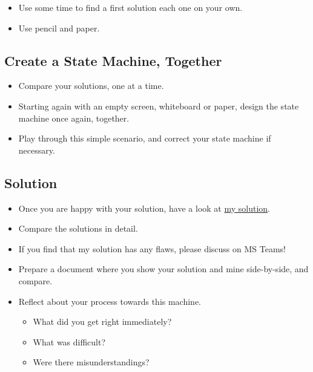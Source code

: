 \documentclass[10pt, twoside, twocolumn]{book}
\providecommand{\tightlist}{%
  \setlength{\itemsep}{0pt}\setlength{\parskip}{0pt}}
\begin{document}
\begin{itemize}
\tightlist
\item
  Use some time to find a first solution each one on your own.
\item
  Use pencil and paper.
\end{itemize}

\hypertarget{create-a-state-machine-together}{%
\subsection{Create a State Machine,
Together}\label{create-a-state-machine-together}}

\begin{itemize}
\tightlist
\item
  Compare your solutions, one at a time.
\item
  Starting again with an empty screen, whiteboard or paper, design the
  state machine once again, together.
\item
  Play through this simple scenario, and correct your state machine if
  necessary.
\end{itemize}

\hypertarget{solution}{%
\subsection{Solution}\label{solution}}

\begin{itemize}
\tightlist
\item
  Once you are happy with your solution, have a look at
  \href{files/kitchen-timer.pdf}{my solution}.
\item
  Compare the solutions in detail.
\item
  If you find that my solution has any flaws, please discuss on MS
  Teams!
\item
  Prepare a document where you show your solution and mine side-by-side,
  and compare.
\item
  Reflect about your process towards this machine.

  \begin{itemize}
  \tightlist
  \item
    What did you get right immediately?
  \item
    What was difficult?
  \item
    Were there misunderstandings?
  \end{itemize}
\end{itemize}
\end{document}
